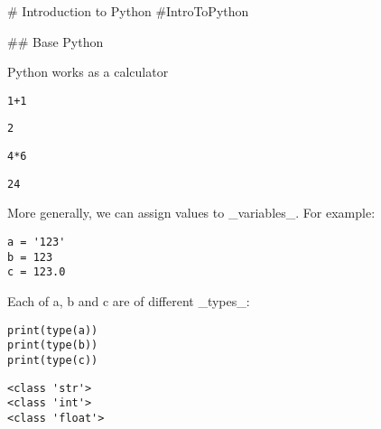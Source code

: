 # Introduction to Python {#IntroToPython}

## Base Python

Python works as a calculator


\begin{verbatim}
1+1
\end{verbatim}
\begin{verbatim}
2
\end{verbatim}


\begin{verbatim}
4*6
\end{verbatim}
\begin{verbatim}
24
\end{verbatim}


More generally, we can assign values to _variables_. For example:


\begin{verbatim}
a = '123'
b = 123
c = 123.0
\end{verbatim}


Each of a, b and c are of different _types_:


\begin{verbatim}
print(type(a))
print(type(b))
print(type(c))
\end{verbatim}
\begin{verbatim}
<class 'str'>
<class 'int'>
<class 'float'>
\end{verbatim}

